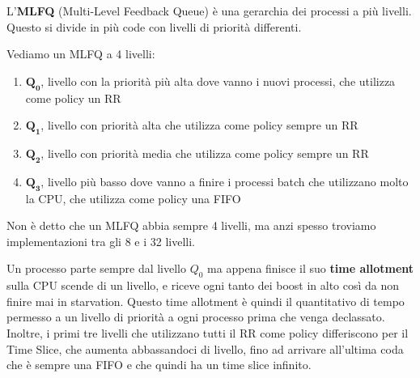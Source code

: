 \documentclass[11pt, a4paper, titlepage, oneside]{scrbook}
\begin{document}
\begin{Definizione}[MLFQ]
\label{def-MLFQ}
L'\textbf{MLFQ} (Multi-Level Feedback Queue) è una gerarchia dei processi a più livelli. Questo si divide in più code con livelli di priorità differenti. 
\end{Definizione}

Vediamo un MLFQ a 4 livelli:
\begin{enumerate}[label=\arabic*°]
    \item $\bm{Q_0}$, livello con la priorità più alta dove vanno i nuovi processi, che utilizza come policy un RR
    \item $\bm{Q_1}$, livello con priorità alta che utilizza come policy sempre un RR 
    \item $\bm{Q_2}$, livello con priorità media che utilizza come policy sempre un RR 
    \item $\bm{Q_3}$, livello più basso dove vanno a finire i processi batch che utilizzano molto la CPU, che utilizza come policy una FIFO
\end{enumerate}

\NB Non è detto che un MLFQ abbia sempre 4 livelli, ma anzi spesso troviamo implementazioni tra gli 8 e i 32 livelli.

Un processo parte sempre dal livello $Q_0$ ma appena finisce il suo \textbf{time allotment} sulla CPU scende di un livello, e riceve ogni tanto dei boost in alto così da non finire mai in starvation. Questo time allotment è quindi il quantitativo di tempo permesso a un livello di priorità a ogni processo prima che venga declassato. Inoltre, i primi tre livelli che utilizzano tutti il RR come policy differiscono per il Time Slice, che aumenta abbassandoci di livello, fino ad arrivare all'ultima coda che è sempre una FIFO e che quindi ha un time slice infinito.
\end{document}

